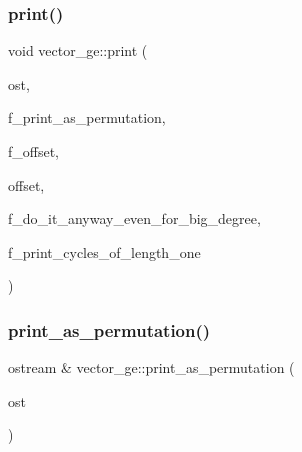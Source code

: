 \mbox{\label{classvector__ge_a146d9cb5c5f3cf203d35e6a0ba295f9a}} 
\subsubsection{\texorpdfstring{print()}{print()}\hspace{0.1cm}{\footnotesize\ttfamily [2/2]}}
{\footnotesize\ttfamily void vector\+\_\+ge\+::print (\begin{DoxyParamCaption}\item[{ostream \&}]{ost,  }\item[{\mbox{\hyperlink{galois_8h_a09fddde158a3a20bd2dcadb609de11dc}{I\+NT}}}]{f\+\_\+print\+\_\+as\+\_\+permutation,  }\item[{\mbox{\hyperlink{galois_8h_a09fddde158a3a20bd2dcadb609de11dc}{I\+NT}}}]{f\+\_\+offset,  }\item[{\mbox{\hyperlink{galois_8h_a09fddde158a3a20bd2dcadb609de11dc}{I\+NT}}}]{offset,  }\item[{\mbox{\hyperlink{galois_8h_a09fddde158a3a20bd2dcadb609de11dc}{I\+NT}}}]{f\+\_\+do\+\_\+it\+\_\+anyway\+\_\+even\+\_\+for\+\_\+big\+\_\+degree,  }\item[{\mbox{\hyperlink{galois_8h_a09fddde158a3a20bd2dcadb609de11dc}{I\+NT}}}]{f\+\_\+print\+\_\+cycles\+\_\+of\+\_\+length\+\_\+one }\end{DoxyParamCaption})}

\mbox{\label{classvector__ge_ac62360340b6ad2484c121584465eeef2}} 
\subsubsection{\texorpdfstring{print\+\_\+as\+\_\+permutation()}{print\_as\_permutation()}}
{\footnotesize\ttfamily ostream \& vector\+\_\+ge\+::print\+\_\+as\+\_\+permutation (\begin{DoxyParamCaption}\item[{ostream \&}]{ost }\end{DoxyParamCaption})}

\mbox{\label{classvector__ge_a07262bf7e62323977854b0884c85d549}} 
